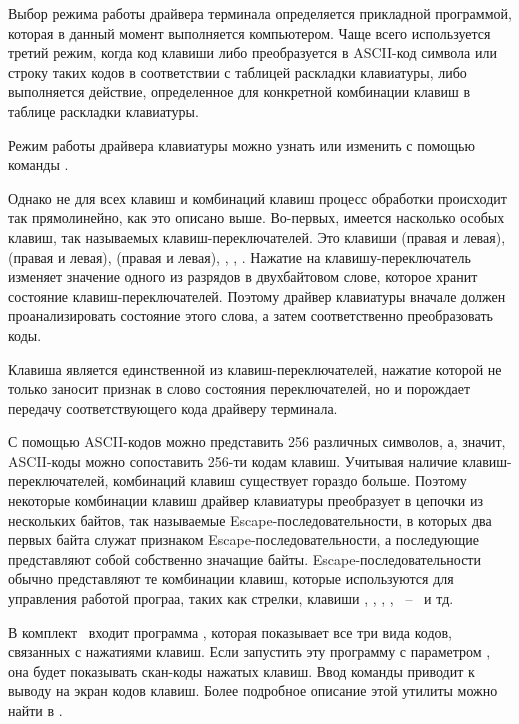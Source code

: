 Выбор режима работы драйвера терминала определяется прикладной программой, которая в данный момент выполняется
компьютером. Чаще всего используется третий режим, когда код клавиши либо преобразуется в ASCII-код символа или строку таких
кодов в соответствии с таблицей раскладки клавиатуры, либо выполняется действие, определенное для конкретной комбинации клавиш
в таблице раскладки клавиатуры. 
\newpar	

Режим работы драйвера клавиатуры можно узнать или изменить с помощью команды . 
\newpar

Однако не для всех клавиш и комбинаций клавиш процесс обработки происходит так прямолинейно, как это
описано выше. Во-первых, имеется насколько особых клавиш, так называемых клавиш-переключателей.
Это клавиши  (правая и левая),  (правая и левая),  (правая и левая), 
, , .
Нажатие на клавишу-переключатель изменяет значение одного из разрядов в двухбайтовом слове, которое хранит состояние
клавиш-переключателей. Поэтому драйвер клавиатуры вначале должен проанализировать состояние этого слова,
а затем соответственно преобразовать коды.
\newpar

Клавиша  является единственной из клавиш-переключателей, нажатие которой не только заносит признак
в слово состояния переключателей, но и порождает передачу соответствующего кода драйверу терминала.
\newpar

С помощью ASCII-кодов можно представить 256 различных символов, а, значит, ASCII-коды можно сопоставить 256-ти кодам 
клавиш. Учитывая наличие клавиш-переключателей, комбинаций клавиш существует гораздо больше. Поэтому некоторые
комбинации клавиш драйвер клавиатуры преобразует в цепочки из нескольких байтов, так называемые Escape-последовательности,
в которых два первых байта служат признаком Escape-последовательности, а последующие представляют собой собственно значащие байты.
Escape-последовательности обычно представляют те комбинации клавиш, которые используются для управления работой програа, таких
как стрелки, клавиши , , , , ~--~ и тд.
\newpar

В комплект \archlinux\ входит программа , которая показывает все три вида кодов, связанных с нажатиями
клавиш. Если запустить эту программу с параметром , она будет показывать скан-коды нажатых клавиш.
Ввод команды  приводит к выводу на экран кодов клавиш. Более подробное описание этой утилиты 
можно найти в .


